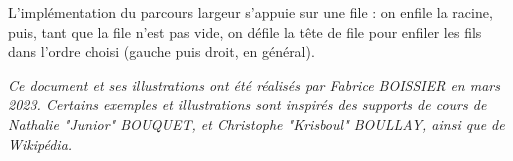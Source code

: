 \documentclass[11pt,a4paper]{article}
\begin{document}
\medskip

L'implémentation du parcours largeur s'appuie sur une file : on enfile la racine, puis, tant que la file n'est pas vide, on défile la tête de file pour enfiler les fils dans l'ordre choisi (gauche puis droit, en général).




\bigskip

\vfillFirst

\vfillLast


\begin{center}
\textit{Ce document et ses illustrations ont été réalisés par Fabrice BOISSIER en mars 2023.
Certains exemples et illustrations sont inspirés des supports de cours de Nathalie "Junior" BOUQUET, et Christophe "Krisboul" BOULLAY, ainsi que de Wikipédia.}
\end{center}
\end{document}
